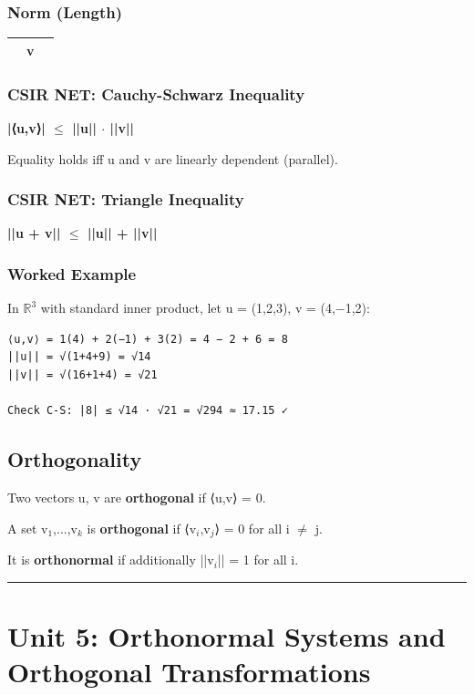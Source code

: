 \documentclass[12pt,a4paper,openany]{book}
\begin{document}
{{\subsubsection{Norm (Length)}
\begin{center}
\begin{tabular}{|l|l|l|}
\hline
\textbf{} & \textbf{v} & \textbf{} \\
\hline
\end{tabular}
\end{center}

\subsubsection{ CSIR NET: Cauchy-Schwarz Inequality}
\textbf{|⟨u,v⟩| $\leq$ ||u|| $\cdot$ ||v||}

Equality holds iff u and v are linearly dependent (parallel).

\subsubsection{ CSIR NET: Triangle Inequality}
\textbf{||u + v|| $\leq$ ||u|| + ||v||}

\subsubsection{Worked Example}
In $\mathbb{R}^3$ with standard inner product, let u = (1,2,3), v = (4,−1,2):

\begin{verbatim}
⟨u,v⟩ = 1(4) + 2(−1) + 3(2) = 4 − 2 + 6 = 8
||u|| = √(1+4+9) = √14
||v|| = √(16+1+4) = √21

Check C-S: |8| ≤ √14 · √21 = √294 ≈ 17.15 ✓
\end{verbatim}

\subsection{Orthogonality}

Two vectors u, v are \textbf{orthogonal} if ⟨u,v⟩ = 0.

A set {v$_1$,...,v$_k$} is \textbf{orthogonal} if ⟨v$_i$,v$_j$⟩ = 0 for all i $\neq$ j.

It is \textbf{orthonormal} if additionally ||v$_i$|| = 1 for all i.

\bigskip\noindent\rule{\textwidth}{0.4pt}\bigskip

\section{Unit 5: Orthonormal Systems and Orthogonal Transformations}

}}
\end{document}
